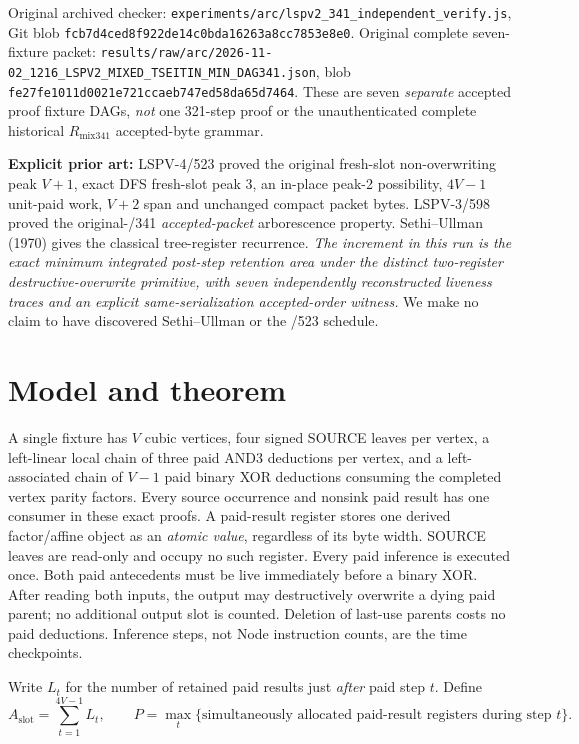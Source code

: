 \documentclass[11pt]{article}
\begin{document}
\noindent Original archived checker: \texttt{experiments/arc/lspv2\_341\_independent\_verify.js}, Git blob \texttt{fcb7d4ced8f922de14c0bda16263a8cc7853e8e0}. Original complete seven-fixture packet: \texttt{results/raw/arc/2026-11-02\_1216\_LSPV2\_MIXED\_TSEITIN\_MIN\_DAG341.json}, blob \texttt{fe27fe1011d0021e721ccaeb747ed58da65d7464}. These are seven \emph{separate} accepted proof fixture DAGs, \emph{not} one 321-step proof or the unauthenticated complete historical $R_{\mathrm{mix341}}$ accepted-byte grammar.

\noindent\textbf{Explicit prior art:} LSPV-4/523 proved the original fresh-slot non-overwriting peak $V+1$, exact DFS fresh-slot peak 3, an in-place peak-2 possibility, $4V-1$ unit-paid work, $V+2$ span and unchanged compact packet bytes. LSPV-3/598 proved the original-/341 \emph{accepted-packet} arborescence property. Sethi--Ullman (1970) gives the classical tree-register recurrence. \emph{The increment in this run is the exact minimum integrated post-step retention area under the distinct two-register destructive-overwrite primitive, with seven independently reconstructed liveness traces and an explicit same-serialization accepted-order witness.} We make no claim to have discovered Sethi--Ullman or the /523 schedule.

\section*{Model and theorem}
A single fixture has $V$ cubic vertices, four signed SOURCE leaves per vertex, a left-linear local chain of three paid AND3 deductions per vertex, and a left-associated chain of $V-1$ paid binary XOR deductions consuming the completed vertex parity factors. Every source occurrence and nonsink paid result has one consumer in these exact proofs. A paid-result register stores one derived factor/affine object as an \emph{atomic value}, regardless of its byte width. SOURCE leaves are read-only and occupy no such register. Every paid inference is executed once. Both paid antecedents must be live immediately before a binary XOR. After reading both inputs, the output may destructively overwrite a dying paid parent; no additional output slot is counted. Deletion of last-use parents costs no paid deductions. Inference steps, not Node instruction counts, are the time checkpoints.

Write $L_t$ for the number of retained paid results just \emph{after} paid step $t$. Define
\[
A_{\mathrm{slot}}=\sum_{t=1}^{4V-1}L_t,\qquad
P=\max_t\{\text{simultaneously allocated paid-result registers during step }t\}.
\]
\end{document}
